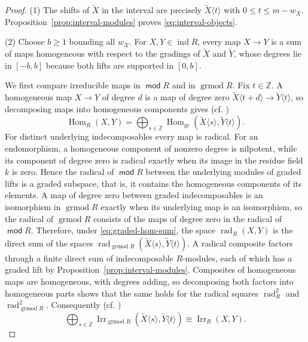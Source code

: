 \documentclass[a4paper,reqno,10pt]{amsart}
\theoremstyle{definition}
\numberwithin{equation}{section}
\DeclareMathOperator{\moduleCategory}{\mathsf{mod}}
\renewcommand{\mod}{\moduleCategory}
\DeclareMathOperator{\ind}{ind}
\DeclareMathOperator{\Hom}{Hom}
\DeclareMathOperator{\Irr}{Irr}
\DeclareMathOperator{\rad}{rad}
\begin{document}
\begin{proof}
(1) The shifts of \(\widetilde X\) in the interval are precisely
\(\widetilde X\langle t\rangle\) with \(0\leq t\leq m-w_X\).
Proposition~\ref{prop:interval-modules} proves \eqref{eq:interval-objects}.

(2) Choose \(b\geq1\) bounding all \(w_X\). For \(X,Y\in\ind R\), every
map \(X\to Y\) is a sum of maps homogeneous with respect to the gradings
of \(\widetilde X\) and \(\widetilde Y\), whose degrees lie in \([-b,b]\)
because both lifts are supported in \([0,b]\).

We first compare irreducible maps in \(\mod R\) and in
\(\operatorname{grmod}R\). Fix \(t\in\mathbb Z\). A homogeneous map
\(X\to Y\) of degree \(d\) is a map of degree zero
\(\widetilde X\langle t+d\rangle\to \widetilde Y\langle t\rangle\), so decomposing maps into
homogeneous components gives (cf. \cite[Lemma~2.1]{GG1})
\begin{equation}\label{eq:graded-hom-sum}
 \Hom_R(X,Y)=\bigoplus_{s\in\mathbb Z}
 \Hom_{\mathrm{gr}}(\widetilde X\langle s\rangle,\widetilde Y\langle t\rangle).
\end{equation}
For distinct underlying indecomposables every map is radical. For an
endomorphism, a homogeneous component of nonzero degree is nilpotent, while
its component of degree zero is radical exactly when its image in the residue
field \(k\) is zero. Hence the radical of \(\mod R\) between the underlying
modules of graded lifts is a graded subspace, that is, it contains the
homogeneous components of its elements. A map of degree zero between graded
indecomposables is an isomorphism in \(\operatorname{grmod}R\) exactly
when its underlying map is an isomorphism, so the radical of
\(\operatorname{grmod}R\) consists of the maps of degree zero in the radical
of \(\mod R\). Therefore, under \eqref{eq:graded-hom-sum}, the space
\(\rad_R(X,Y)\) is the direct sum of the spaces
\(\rad_{\operatorname{grmod}R}(\widetilde X\langle s\rangle,\widetilde Y\langle t\rangle)\). A
radical composite factors through a finite direct sum of indecomposable
\(R\)-modules, each of which has a graded lift by
Proposition~\ref{prop:interval-modules}. Composites of homogeneous maps are
homogeneous, with degrees adding, so decomposing both factors into
homogeneous parts shows that the same holds for the radical squares
\(\rad_R^2\) and \(\rad_{\operatorname{grmod}R}^2\).
Consequently (cf. \cite[Theorem~3.5]{GG2})
\begin{equation}\label{eq:graded-irreducible}
 \bigoplus_{s\in\mathbb Z}
 \Irr_{\operatorname{grmod}R}(\widetilde X\langle s\rangle,\widetilde Y\langle t\rangle)
 \cong\Irr_R(X,Y).
\end{equation}


\end{proof}
\end{document}
